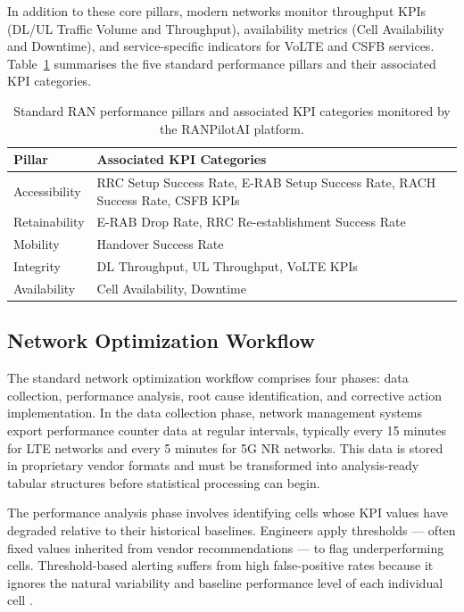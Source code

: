 In addition to these core pillars, modern networks monitor throughput KPIs (DL/UL Traffic Volume and Throughput), availability metrics (Cell Availability and Downtime), and service-specific indicators for VoLTE and CSFB services. Table~\ref{tab:kpi_pillars} summarises the five standard performance pillars and their associated KPI categories.

\begin{table}[H]
    \centering
    \caption{Standard RAN performance pillars and associated KPI categories monitored by the RANPilotAI platform.}
    \label{tab:kpi_pillars}
    \begin{tabular}{|l|p{8cm}|}
        \hline
        \textbf{Pillar} & \textbf{Associated KPI Categories} \\
        \hline
        Accessibility & RRC Setup Success Rate, E-RAB Setup Success Rate, RACH Success Rate, CSFB KPIs \\
        \hline
        Retainability & E-RAB Drop Rate, RRC Re-establishment Success Rate \\
        \hline
        Mobility & Handover Success Rate \\
        \hline
        Integrity & DL Throughput, UL Throughput, VoLTE KPIs \\
        \hline
        Availability & Cell Availability, Downtime \\
        \hline
    \end{tabular}
\end{table}

\subsection{Network Optimization Workflow}

The standard network optimization workflow comprises four phases: data collection, performance analysis, root cause identification, and corrective action implementation. In the data collection phase, network management systems export performance counter data at regular intervals, typically every 15 minutes for LTE networks and every 5 minutes for 5G NR networks. This data is stored in proprietary vendor formats and must be transformed into analysis-ready tabular structures before statistical processing can begin.

The performance analysis phase involves identifying cells whose KPI values have degraded relative to their historical baselines. Engineers apply thresholds — often fixed values inherited from vendor recommendations — to flag underperforming cells. Threshold-based alerting suffers from high false-positive rates because it ignores the natural variability and baseline performance level of each individual cell \cite{mishra2007}.

